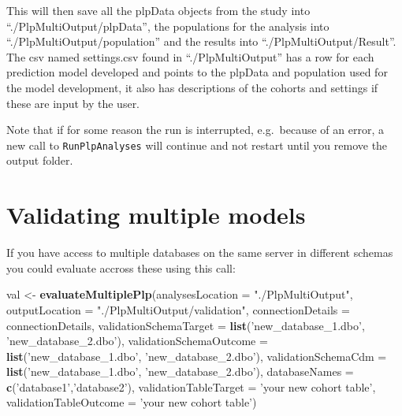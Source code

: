 \documentclass[
]{article}
\newenvironment{Shaded}{\begin{snugshade}}{\end{snugshade}}
\newcommand{\DataTypeTok}[1]{\textcolor[rgb]{0.13,0.29,0.53}{#1}}
\newcommand{\KeywordTok}[1]{\textcolor[rgb]{0.13,0.29,0.53}{\textbf{#1}}}
\newcommand{\NormalTok}[1]{#1}
\newcommand{\StringTok}[1]{\textcolor[rgb]{0.31,0.60,0.02}{#1}}
\begin{document}
This will then save all the plpData objects from the study into
``./PlpMultiOutput/plpData'', the populations for the analysis into
``./PlpMultiOutput/population'' and the results into
``./PlpMultiOutput/Result''. The csv named settings.csv found in
``./PlpMultiOutput'' has a row for each prediction model developed and
points to the plpData and population used for the model development, it
also has descriptions of the cohorts and settings if these are input by
the user.

Note that if for some reason the run is interrupted, e.g.~because of an
error, a new call to \texttt{RunPlpAnalyses} will continue and not
restart until you remove the output folder.

\hypertarget{validating-multiple-models}{%
\section{Validating multiple models}\label{validating-multiple-models}}

If you have access to multiple databases on the same server in different
schemas you could evaluate accross these using this call:

\begin{Shaded}
\begin{Highlighting}[]
\NormalTok{val <-}\StringTok{ }\KeywordTok{evaluateMultiplePlp}\NormalTok{(}\DataTypeTok{analysesLocation =} \StringTok{"./PlpMultiOutput"}\NormalTok{,}
                           \DataTypeTok{outputLocation =} \StringTok{"./PlpMultiOutput/validation"}\NormalTok{,}
                           \DataTypeTok{connectionDetails =}\NormalTok{ connectionDetails, }
                           \DataTypeTok{validationSchemaTarget =} \KeywordTok{list}\NormalTok{(}\StringTok{'new_database_1.dbo'}\NormalTok{,}
                                                              \StringTok{'new_database_2.dbo'}\NormalTok{),}
                           \DataTypeTok{validationSchemaOutcome =} \KeywordTok{list}\NormalTok{(}\StringTok{'new_database_1.dbo'}\NormalTok{,}
                                                              \StringTok{'new_database_2.dbo'}\NormalTok{),}
                           \DataTypeTok{validationSchemaCdm =} \KeywordTok{list}\NormalTok{(}\StringTok{'new_database_1.dbo'}\NormalTok{,}
                                                              \StringTok{'new_database_2.dbo'}\NormalTok{), }
                           \DataTypeTok{databaseNames =} \KeywordTok{c}\NormalTok{(}\StringTok{'database1'}\NormalTok{,}\StringTok{'database2'}\NormalTok{),}
                           \DataTypeTok{validationTableTarget =} \StringTok{'your new cohort table'}\NormalTok{,}
                           \DataTypeTok{validationTableOutcome =} \StringTok{'your new cohort table'}\NormalTok{)}
\end{Highlighting}
\end{Shaded}
\end{document}
